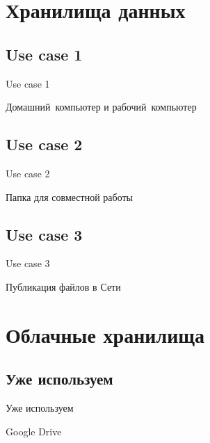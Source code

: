 \documentclass[compress,red]{beamer}
\begin{document}
\section{Хранилища данных}
\subsection{Use case 1}
\begin{frame}
  \begin{center}
    \Huge{Use case 1}
  \end{center}
  \begin{center}
    \Large{Домашний~компьютер и рабочий~компьютер}
  \end{center}
\end{frame}

\subsection{Use case 2}
\begin{frame}
  \begin{center}
    \Huge{Use case 2}
  \end{center}
  \begin{center}
    \Large{Папка для совместной работы}
  \end{center}
\end{frame}

\subsection{Use case 3}
\begin{frame}
  \begin{center}
    \Huge{Use case 3}
  \end{center}
  \begin{center}
    \Large{Публикация файлов в Сети}
  \end{center}
\end{frame}

\section{Облачные хранилища}

\subsection{Уже используем}
\begin{frame}
  \begin{center}
    \Huge{Уже используем}
  \end{center}
  \begin{center}
    \Large{Google Drive}
  \end{center}
\end{frame}
\end{document}
